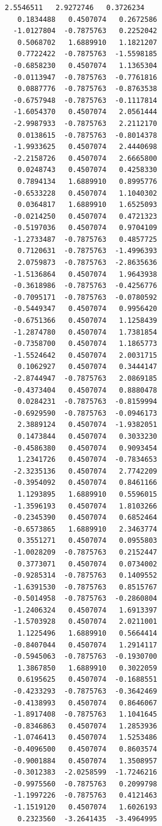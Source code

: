 \documentclass[11pt]{article}
\begin{document}
\begin{Verbatim}[commandchars=\\\{\}]
   2.5546511   2.9272746   0.3726234
   0.1834488   0.4507074   0.2672586
  -1.0127804  -0.7875763   0.2252042
   0.5068702   1.6889910   1.1821207
   0.7722422  -0.7875763  -1.5598185
  -0.6858230   0.4507074   1.1365304
  -0.0113947  -0.7875763  -0.7761816
   0.0887776  -0.7875763  -0.8763538
  -0.6757948  -0.7875763  -0.1117814
  -1.6054370   0.4507074   2.0561444
  -2.9987933  -0.7875763   2.2112170
   0.0138615  -0.7875763  -0.8014378
  -1.9933625   0.4507074   2.4440698
  -2.2158726   0.4507074   2.6665800
   0.0248743   0.4507074   0.4258330
   0.7894134   1.6889910   0.8995776
  -0.6533228   0.4507074   1.1040302
   0.0364817   1.6889910   1.6525093
  -0.0214250   0.4507074   0.4721323
  -0.5197036   0.4507074   0.9704109
  -1.2733487  -0.7875763   0.4857725
   0.7120631  -0.7875763  -1.4996393
   2.0759873  -0.7875763  -2.8635636
  -1.5136864   0.4507074   1.9643938
  -0.3618986  -0.7875763  -0.4256776
  -0.7095171  -0.7875763  -0.0780592
  -0.5449347   0.4507074   0.9956420
  -0.6751366   0.4507074   1.1258439
  -1.2874780   0.4507074   1.7381854
  -0.7358700   0.4507074   1.1865773
  -1.5524642   0.4507074   2.0031715
   0.1062927   0.4507074   0.3444147
  -2.8744947  -0.7875763   2.0869185
  -0.4373404   0.4507074   0.8880478
   0.0284231  -0.7875763  -0.8159994
  -0.6929590  -0.7875763  -0.0946173
   2.3889124   0.4507074  -1.9382051
   0.1473844   0.4507074   0.3033230
  -0.4586380   0.4507074   0.9093454
   1.2341726   0.4507074  -0.7834653
  -2.3235136   0.4507074   2.7742209
  -0.3954092   0.4507074   0.8461166
   1.1293895   1.6889910   0.5596015
  -1.3596193   0.4507074   1.8103266
  -0.2345390   0.4507074   0.6852464
  -0.6573865   1.6889910   2.3463774
   0.3551271   0.4507074   0.0955803
  -1.0028209  -0.7875763   0.2152447
   0.3773071   0.4507074   0.0734002
  -0.9285314  -0.7875763   0.1409552
  -1.6391530  -0.7875763   0.8515767
  -0.5014958  -0.7875763  -0.2860804
  -1.2406324   0.4507074   1.6913397
  -1.5703928   0.4507074   2.0211001
   1.1225496   1.6889910   0.5664414
  -0.8407044   0.4507074   1.2914117
  -0.5945063  -0.7875763  -0.1930700
   1.3867850   1.6889910   0.3022059
   0.6195625   0.4507074  -0.1688551
  -0.4233293  -0.7875763  -0.3642469
  -0.4138993   0.4507074   0.8646067
  -1.8917408  -0.7875763   1.1041645
  -0.8346863   0.4507074   1.2853936
  -1.0746413   0.4507074   1.5253486
  -0.4096500   0.4507074   0.8603574
  -0.9001884   0.4507074   1.3508957
  -0.3012383  -2.0258599  -1.7246216
  -0.9975560  -0.7875763   0.2099798
  -1.1997226  -0.7875763   0.4121463
  -1.1519120   0.4507074   1.6026193
   0.2323560  -3.2641435  -3.4964995

\end{Verbatim}
\end{document}
